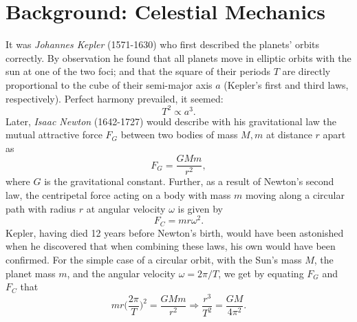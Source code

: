 \documentclass[]{article}
\begin{document}
\section{Background: Celestial Mechanics} \label{celestial-mechanics}
It was \textit{Johannes Kepler} (1571-1630) who first described the planets' orbits correctly. By observation he found that all planets move in elliptic orbits with the sun at one of the two foci; and that the square of their periods $T$ are directly proportional to the cube of their semi-major axis $a$ \cite{hibbeler2001} (Kepler's first and third laws, respectively). Perfect harmony prevailed, it seemed:
\begin{equation}
	T^2 \propto a^3.
\end{equation}
Later, \textit{Isaac Newton} (1642-1727) would describe with his gravitational law the mutual attractive force $F_G$ between two bodies of mass $M, m$ at distance $r$ apart as
\begin{equation} \label{newton-grav}
	F_G = \frac{GMm}{r^2},
\end{equation}
where $G$ is the gravitational constant. Further, as a result of Newton's second law, the centripetal force acting on a body with mass $m$ moving along a circular path with radius $r$ at angular velocity $\omega$ is given by
\begin{equation}
	F_C = mr\omega^2.
\end{equation}
Kepler, having died 12 years before Newton's birth, would have been astonished when he discovered that when combining these laws, his own would have been confirmed. For the simple case of a circular orbit, with the Sun's mass $M$, the planet mass $m$, and the angular velocity $\omega = 2\pi/T$, we get by equating $F_G$ and $F_C$ that
\begin{equation} \label{r3-T2}
	mr\bigg(\frac{2\pi}{T}\bigg)^2 = \frac{GMm}{r^2} \Rightarrow \frac{r^3}{T^2} = \frac{GM}{4\pi^2}.
\end{equation}
\end{document}
